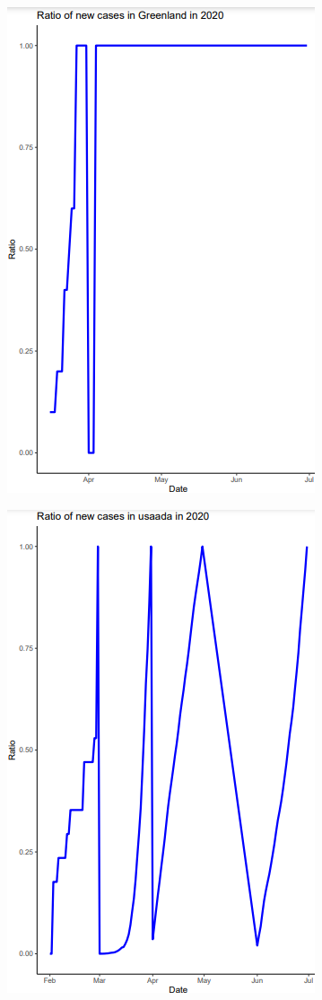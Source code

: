 \documentclass[a4paper]{article}
\theoremstyle{definition}
\begin{document}
\begin{enumerate}[i)]
\begin{enumerate}[1]
\begin{figure}[H]
				\includegraphics[scale=0.8]{images/5.7.2.png}
			\end{figure}
			\begin{figure}[H]
				\centering
				\includegraphics[scale=0.8]{images/5.7.3.png}

\end{figure}
\end{enumerate}
\end{enumerate}
\end{document}
